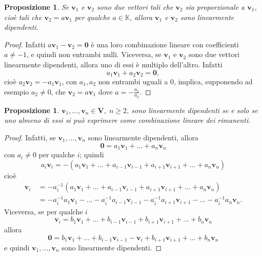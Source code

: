 \documentclass{article}
\theoremstyle{plain}
\newtheorem{prop}[thm]{Proposizione}
\theoremstyle{definition}
\theoremstyle{remark}
\begin{document}
\vspace{10pt}

\begin{bxthm}
\begin{prop}\label{prop:quattrosei}
    Se \( \mathbf{v}_1 \) e \( \mathbf{v}_2 \) sono due vettori tali che \( \mathbf{v}_2 \) sia proporzionale a \( \mathbf{v}_1 \), cioè tali che \( \mathbf{v}_2 = a\mathbf{v}_1 \) per qualche \( a \in \mathbb{K} \), allora \( \mathbf{v}_1 \) e \( \mathbf{v}_2 \) sono linearmente dipendenti.
\end{prop}
\end{bxthm}
\begin{proof}
    Infatti \( a \mathbf{v}_1 - \mathbf{v}_2 = \mathbf{0} \) è una loro combinazione lineare con coefficienti \( a \neq -1 \), e quindi non entrambi nulli.
    Viceversa, se \( \mathbf{v}_1 \) e \( \mathbf{v}_2 \) sono due vettori linearmente dipendenti, allora uno di essi è multiplo dell'altro. 
    Infatti \[ a_1\mathbf{v}_1 + a_2\mathbf{v}_2 = \mathbf{0}, \] cioè \( a_2\mathbf{v}_2 = -a_1\mathbf{v}_1 \), con \( a_1, a_2 \) non entrambi uguali a $0$, implica, supponendo ad esempio \( a_2 \neq 0 \), che \( \mathbf{v}_2 = a\mathbf{v}_1 \) dove \( a = -\frac{a_1}{a_2} \).
\end{proof}

\vspace{10pt}

\begin{bxthm}
\begin{prop}\label{prop:quattrosette}
    \( \mathbf{v}_1, \ldots, \mathbf{v}_n \in \mathbf{V},\; n \geq 2 \), sono linearmente dipendenti se e solo se uno almeno di essi si può esprimere come combinazione lineare dei rimanenti.
\end{prop}
\end{bxthm}
\begin{proof}
    Infatti, se \( \mathbf{v}_1, \ldots, \mathbf{v}_n \) sono linearmente dipendenti, allora
    \[ \mathbf{0} = a_1\mathbf{v}_1 + \ldots + a_n\mathbf{v}_n \]
    con \( a_i \neq 0 \) per qualche \( i \); quindi
    \[ a_i \mathbf{v}_i = - (a_1\mathbf{v}_1 + \ldots + a_{i-1}\mathbf{v}_{i-1} + a_{i+1}\mathbf{v}_{i+1} + \ldots + a_n\mathbf{v}_n) \]
    cioè
    \begin{align*}
        \mathbf{v}_i &\,= -a_i^{-1} (a_1\mathbf{v}_1 + \ldots + a_{i-1}\mathbf{v}_{i-1} + a_{i+1}\mathbf{v}_{i+1} + \ldots + a_n\mathbf{v}_n) \\
        &\,= -a_i^{-1}a_1\mathbf{v}_1 - \ldots - a_i^{-1}a_{i-1}\mathbf{v}_{i-1} - a_i^{-1}a_{i+1}\mathbf{v}_{i+1} - \ldots - a_i^{-1}a_n\mathbf{v}_n. 
    \end{align*}
    Viceversa, se per qualche \( i \)
    \[ \mathbf{v}_i = b_1\mathbf{v}_1 + \ldots + b_{i-1}\mathbf{v}_{i-1} + b_{i+1}\mathbf{v}_{i+1} + \ldots + b_n\mathbf{v}_n \]
    allora
    \[ \mathbf{0} = b_1\mathbf{v}_1 + \ldots + b_{i-1}\mathbf{v}_{i-1} - \mathbf{v}_i + b_{i+1}\mathbf{v}_{i+1} + \ldots + b_n\mathbf{v}_n \]
    e quindi \( \mathbf{v}_1, \ldots, \mathbf{v}_n \) sono linearmente dipendenti.
\end{proof}
\end{document}
